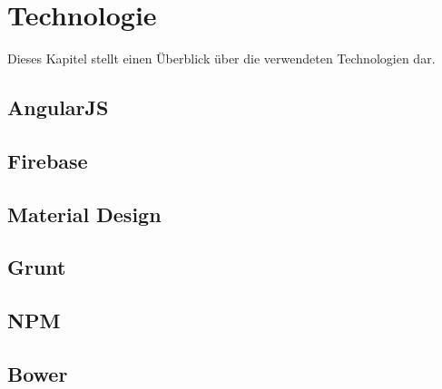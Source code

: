 \chapter{Technologie}
Dieses Kapitel stellt einen Überblick über die verwendeten Technologien dar.
\label{chap_2}
\section{AngularJS}
\section{Firebase}
\section{Material Design}
\section{Grunt}
\section{NPM}
\section{Bower}

